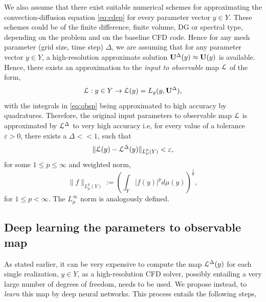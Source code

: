 \documentclass[a4paper]{article}
\numberwithin{equation}{section}
\numberwithin{equation}{section}
\theoremstyle{definition}
\theoremstyle{myremarkstyle}
\renewcommand{\leq}{\leqslant}
\renewcommand{\epsilon}{\varepsilon}
\newcommand{\U}{{\bf U}}		%
\newcommand{\map}{\EuScript{L}}
\begin{document}
We also assume that there exist suitable numerical schemes for approximating the convection-diffusion equation \eqref{eq:cdep} for every parameter vector $y \in Y$. These schemes could be of the finite difference, finite volume, DG or spectral
type, depending on the problem and on the baseline CFD code. Hence for any mesh parameter (grid size, time step) $\Delta$, we are assuming that for any parameter vector $y \in Y$, a high-resolution approximate solution $\U^{\Delta}(y) \approx \U(y)$ is available. Hence, there exists an approximation to the \emph{input to observable} map $\map$ of the form,
 \begin{equation}
\label{eq:ptoob1}
\map:y \in Y \rightarrow \map(y) = L_g(y,\U^\Delta),
\end{equation}
with the integrals in \eqref{eq:obsp} being approximated to high accuracy by quadratures. Therefore, the original input parameters to observable map $\map$ is approximated by $\map^{\Delta}$ to very high accuracy i.e, for every value of a tolerance $\epsilon > 0$, there exists a $\Delta << 1$, such that
\begin{equation}
\label{eq:err1}
\|\map(y) - \map^{\Delta}(y)\|_{L_{\mu}^p(Y)} < \epsilon,
\end{equation}
for some $1 \leq p \leq \infty$ and weighted norm, 
$$
\|f\|_{L_{\mu}^p(Y)} := \left(\int_Y |f(y)|^p d\mu(y) \right)^{\frac{1}{p}},
$$
for $1 \leq p < \infty$. The $L^{\infty}_{\mu}$ norm is analogously defined.  

\subsection{Deep learning the parameters to observable map}
\label{sec:2.2}
As stated earlier, it can be very expensive to compute the map $\map^{\Delta}(y)$ for each single realization, $y \in Y$, as a high-resolution CFD solver, possibly entailing a very large number of 
degrees of freedom, needs to be used. We propose instead, to  \emph{learn} this map by deep neural networks. This process entails the following steps,
\end{document}
